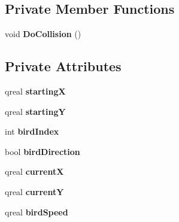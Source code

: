 \subsection*{Private Member Functions}
\begin{DoxyCompactItemize}
\item 
\hypertarget{classbird_af879cd57331fed816b31c9c55dccc2d3}{void {\bfseries Do\-Collision} ()}\label{classbird_af879cd57331fed816b31c9c55dccc2d3}

\end{DoxyCompactItemize}
\subsection*{Private Attributes}
\begin{DoxyCompactItemize}
\item 
\hypertarget{classbird_af7b5a9bd3d6b251b619f40f8b0b9f9c2}{qreal {\bfseries starting\-X}}\label{classbird_af7b5a9bd3d6b251b619f40f8b0b9f9c2}

\item 
\hypertarget{classbird_ae2fa3b28fa9cc254ab5bba8a059ce21e}{qreal {\bfseries starting\-Y}}\label{classbird_ae2fa3b28fa9cc254ab5bba8a059ce21e}

\item 
\hypertarget{classbird_a76b8b717e08d5ca53362bf2d51ce5129}{int {\bfseries bird\-Index}}\label{classbird_a76b8b717e08d5ca53362bf2d51ce5129}

\item 
\hypertarget{classbird_aec894456d4a79babbe8ec0fcec89bde9}{bool {\bfseries bird\-Direction}}\label{classbird_aec894456d4a79babbe8ec0fcec89bde9}

\item 
\hypertarget{classbird_a8f35516c51ff45a4b0e871f55a31f023}{qreal {\bfseries current\-X}}\label{classbird_a8f35516c51ff45a4b0e871f55a31f023}

\item 
\hypertarget{classbird_a1b350aac1f8b5784818d4cd298394385}{qreal {\bfseries current\-Y}}\label{classbird_a1b350aac1f8b5784818d4cd298394385}

\item 
\hypertarget{classbird_a467e826c1b91d9271a8225e2f63b8be4}{qreal {\bfseries bird\-Speed}}\label{classbird_a467e826c1b91d9271a8225e2f63b8be4}

\end{DoxyCompactItemize}


